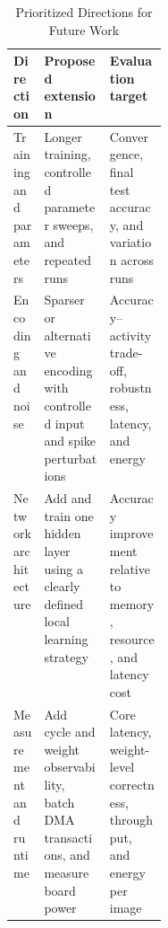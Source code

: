 \begin{table}[htbp]
	\centering
	\caption{Prioritized Directions for Future Work}
	\label{tab:future-work-directions}
	\small
	\begin{tabularx}{\linewidth}{@{}p{0.20\linewidth}XX@{}}
		\toprule
		\textbf{Direction} & \textbf{Proposed extension} & \textbf{Evaluation target} \\
		\midrule
		Training and parameters & Longer training, controlled parameter sweeps, and repeated runs & Convergence, final test accuracy, and variation across runs \\
		Encoding and noise & Sparser or alternative encoding with controlled input and spike perturbations & Accuracy--activity trade-off, robustness, latency, and energy \\
		Network architecture & Add and train one hidden layer using a clearly defined local learning strategy & Accuracy improvement relative to memory, resource, and latency cost \\
		Measurement and runtime & Add cycle and weight observability, batch DMA transactions, and measure board power & Core latency, weight-level correctness, throughput, and energy per image \\
		\bottomrule
	\end{tabularx}
\end{table}
